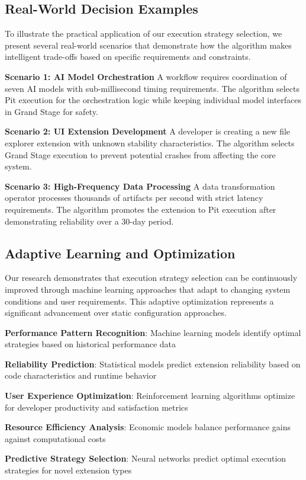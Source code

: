 \subsection*{Real-World Decision Examples}

To illustrate the practical application of our execution strategy selection, we present several real-world scenarios that demonstrate how the algorithm makes intelligent trade-offs based on specific requirements and constraints.

\textbf{Scenario 1: AI Model Orchestration}
A workflow requires coordination of seven AI models with sub-millisecond timing requirements. The algorithm selects Pit execution for the orchestration logic while keeping individual model interfaces in Grand Stage for safety.

\textbf{Scenario 2: UI Extension Development}
A developer is creating a new file explorer extension with unknown stability characteristics. The algorithm selects Grand Stage execution to prevent potential crashes from affecting the core system.

\textbf{Scenario 3: High-Frequency Data Processing}
A data transformation operator processes thousands of artifacts per second with strict latency requirements. The algorithm promotes the extension to Pit execution after demonstrating reliability over a 30-day period.

\subsection*{Adaptive Learning and Optimization}

Our research demonstrates that execution strategy selection can be continuously improved through machine learning approaches that adapt to changing system conditions and user requirements. This adaptive optimization represents a significant advancement over static configuration approaches.

\begin{expandedlist}
    \item \textbf{Performance Pattern Recognition}: Machine learning models identify optimal strategies based on historical performance data
    \item \textbf{Reliability Prediction}: Statistical models predict extension reliability based on code characteristics and runtime behavior
    \item \textbf{User Experience Optimization}: Reinforcement learning algorithms optimize for developer productivity and satisfaction metrics
    \item \textbf{Resource Efficiency Analysis}: Economic models balance performance gains against computational costs
    \item \textbf{Predictive Strategy Selection}: Neural networks predict optimal execution strategies for novel extension types
\end{expandedlist}

